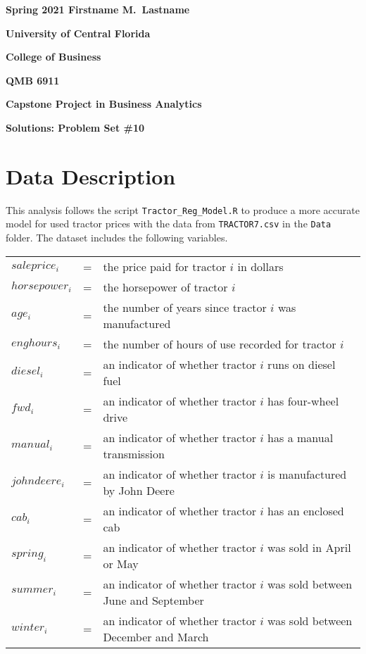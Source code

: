 \documentclass[11pt]{paper}
\begin{document}

\pagestyle{empty}
{\noindent\bf Spring 2021 \hfill Firstname M.~Lastname}
\vskip 16pt
\centerline{\bf University of Central Florida}
\centerline{\bf College of Business}
\vskip 16pt
\centerline{\bf QMB 6911}
\centerline{\bf Capstone Project in Business Analytics}
\vskip 10pt
\centerline{\bf Solutions:  Problem Set \#10}
\vskip 32pt
\noindent
% 
\section{Data Description}

This analysis follows the script \texttt{Tractor\_Reg\_Model.R} to produce a more accurate model for used tractor prices with the data from \texttt{TRACTOR7.csv} in the \texttt{Data} folder. 
The dataset includes the following variables.
\begin{table}[h!]
\begin{tabular}{l l l}

$saleprice_i$ & = & the price paid for tractor $i$ in dollars \\
% 
$horsepower_i$ & = & the horsepower of tractor $i$ \\
$age_i$ & = & the number of years since tractor $i$ was manufactured  \\
$enghours_i$ & = & the number of hours of use recorded for tractor $i$  \\
$diesel_i$ & = & an indicator of whether tractor $i$ runs on diesel fuel \\ %
$fwd_i$ & = & an indicator of whether tractor $i$ has four-wheel drive \\ %
$manual_i$ & = & an indicator of whether tractor $i$ has a manual transmission \\ %
$johndeere_i$ & = & an indicator of whether tractor $i$ is manufactured by John Deere \\ %
$cab_i$ & = & an indicator of whether tractor $i$ has an enclosed cab \\ %
% 
$spring_i$ & = & an indicator of whether tractor $i$ was sold in April or May \\ %
$summer_i$ & = & an indicator of whether tractor $i$ was sold between June and September \\ %
$winter_i$ & = & an indicator of whether tractor $i$ was sold between December and March \\ %

\end{tabular}
\end{table}
%
\end{document}
